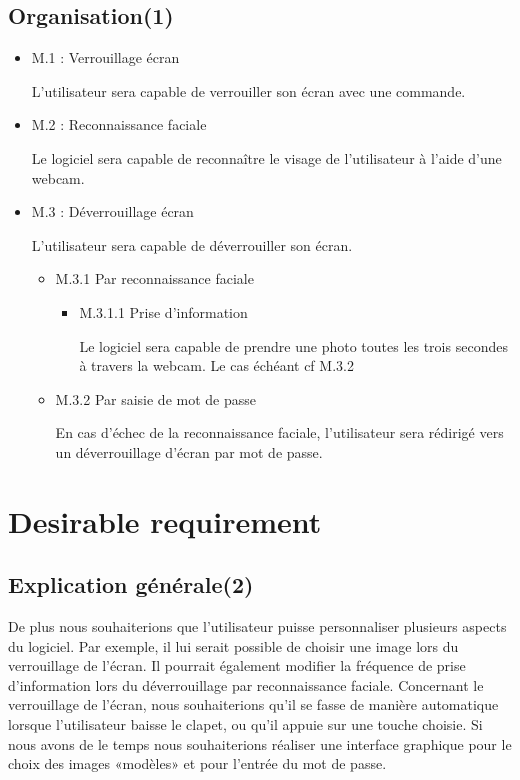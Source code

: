   \subsection{Organisation(1)}
  \begin{itemize}
    \item{M.1 : Verrouillage écran}

    L’utilisateur sera capable de verrouiller son écran avec une commande.
    \\
    \item{M.2 : Reconnaissance faciale}

    Le logiciel sera capable de reconnaître le visage de l’utilisateur à
    l’aide d’une webcam.
    \\
    \item{M.3 : Déverrouillage écran}

    L’utilisateur sera capable de déverrouiller son écran.
    \begin{itemize}
      \item{M.3.1 Par reconnaissance faciale}
      \begin{itemize}
        \item{M.3.1.1 Prise d’information}

        Le logiciel sera capable de prendre une photo toutes les trois
        secondes à travers la webcam.
		    Le cas échéant cf M.3.2
        \end{itemize}
        \vspace{0.5cm}
      \item{M.3.2 Par saisie de mot de passe}

      En cas d’échec de la reconnaissance faciale, l'utilisateur sera rédirigé
      vers un déverrouillage d'écran par mot de passe.
      \end{itemize}
  \end{itemize}

\section{Desirable requirement}
  \subsection{Explication générale(2)}
  De plus nous souhaiterions que l’utilisateur puisse personnaliser plusieurs
  aspects du logiciel. Par exemple, il lui serait possible de choisir une image
  lors du verrouillage de l’écran. Il pourrait également modifier la fréquence
  de prise d’information lors du déverrouillage par reconnaissance faciale.
  Concernant le verrouillage de l’écran, nous souhaiterions qu’il se fasse de
  manière automatique lorsque l’utilisateur baisse le clapet, ou qu’il appuie
  sur une touche choisie.
  Si nous avons de le temps nous souhaiterions réaliser une interface graphique
  pour le choix des images «modèles» et pour l’entrée du mot de passe.


